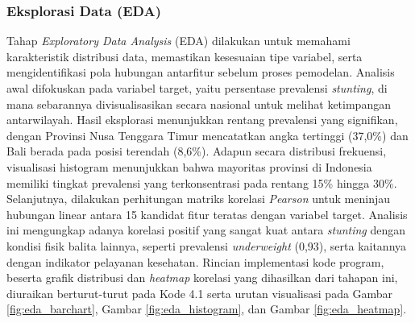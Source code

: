 \subsubsection{Eksplorasi Data (EDA)}
Tahap \textit{Exploratory Data Analysis} (EDA) dilakukan untuk memahami karakteristik distribusi data, memastikan kesesuaian tipe variabel, serta mengidentifikasi pola hubungan antarfitur sebelum proses pemodelan. Analisis awal difokuskan pada variabel target, yaitu persentase prevalensi \textit{stunting}, di mana sebarannya divisualisasikan secara nasional untuk melihat ketimpangan antarwilayah. Hasil eksplorasi menunjukkan rentang prevalensi yang signifikan, dengan Provinsi Nusa Tenggara Timur mencatatkan angka tertinggi (37,0\%) dan Bali berada pada posisi terendah (8,6\%). Adapun secara distribusi frekuensi, visualisasi histogram menunjukkan bahwa mayoritas provinsi di Indonesia memiliki tingkat prevalensi yang terkonsentrasi pada rentang 15\% hingga 30\%. Selanjutnya, dilakukan perhitungan matriks korelasi \textit{Pearson} untuk meninjau hubungan linear antara 15 kandidat fitur teratas dengan variabel target. Analisis ini mengungkap adanya korelasi positif yang sangat kuat antara \textit{stunting} dengan kondisi fisik balita lainnya, seperti prevalensi \textit{underweight} (0,93), serta kaitannya dengan indikator pelayanan kesehatan. Rincian implementasi kode program, beserta grafik distribusi dan \textit{heatmap} korelasi yang dihasilkan dari tahapan ini, diuraikan berturut-turut pada Kode 4.1 serta urutan visualisasi pada Gambar \ref{fig:eda_barchart}, Gambar \ref{fig:eda_histogram}, dan Gambar \ref{fig:eda_heatmap}.

